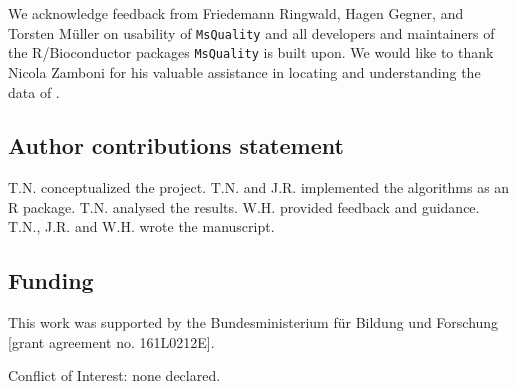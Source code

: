 \documentclass{bioinfo}
\begin{document}
We acknowledge feedback from Friedemann Ringwald, Hagen Gegner, and 
Torsten M\"uller on usability of 
\texttt{MsQuality} and all developers and maintainers of the R/Bioconductor 
packages \texttt{MsQuality} is built upon. We would like to thank Nicola Zamboni
for his valuable assistance in locating and understanding the data of 
\citet{Cherkaoui2022}. 

\subsection{Author contributions statement}

T.N. conceptualized the project. T.N. and J.R. implemented the algorithms as 
an R package. T.N. analysed the results. W.H. provided feedback and guidance. 
T.N., J.R. and W.H. wrote the manuscript.

\subsection{Funding}

This work was supported by the Bundesministerium für Bildung und Forschung 
[grant agreement no. 161L0212E].

Conflict of Interest: none declared.
\end{document}
